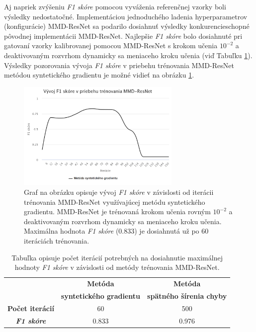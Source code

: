Aj napriek zvýšeniu \textit{F1 skóre} pomocou vyváženia referenčnej vzorky boli výsledky nedostatočné. Implementáciou jednoduchého ladenia hyperparametrov (konfigurácie) MMD-ResNet sa podarilo dosiahnuť výsledky konkurencieschopné pôvodnej implementácii MMD-ResNet. Najlepšie \textit{F1 skóre} bolo dosiahnuté pri gatovaní vzorky kalibrovanej pomocou MMD-ResNet s krokom učenia $10^{-2}$ a deaktivovaným rozvrhom dynamicky sa meniaceho kroku učenia (viď Tabuľku \ref{vysledok7b}). Výsledky pozorovania vývoja \textit{F1 skóre} v priebehu trénovania MMD-ResNet metódou syntetického gradientu je možné vidieť na obrázku \ref{vysledok7}.

\begin{figure}
\centerline{\includegraphics[width=0.7\textwidth]{images/experimenty/experiment7.png}}
\caption[Vývoj \textit{F1 skóre} v priebehu trénovania MMD-ResNet]{Graf na obrázku opisuje vývoj \textit{F1 skóre} v závislosti od iterácii trénovania MMD-ResNet využívajúcej metódu syntetického gradientu. MMD-ResNet je trénovaná krokom učenia rovným $10^{-2}$ a deaktivovaným rozvrhom dynamicky sa meniaceho kroku učenia. Maximálna hodnota \textit{F1 skóre} (0.833) je dosiahnutá už po 60 iteráciách trénovania.}
\label{vysledok7}
\end{figure}

\begin{table}[h!]
\caption[Porovnanie \textit{F1 skóre} v závislosti od rôznych metód trénovania MMD-ResNet]{Tabuľka opisuje počet iterácií potrebných na dosiahnutie maximálnej hodnoty \textit{F1 skóre} v závislosti od metódy trénovania MMD-ResNet.}
\label{vysledok7b}
\begin{center}
\begin{tabular}{|c|c|c|}
\hline
  & \textbf{Metóda} & \textbf{Metóda} \\
  & \textbf{syntetického gradientu} & \textbf{spätného šírenia chyby} \\
\hline
\textbf{Počet iterácií} & 60 & 500 \\
\hline
\textbf{\textit{F1 skóre}} & 0.833 & 0.976 \\
\hline
\end{tabular}%
\end{center}
\end{table}